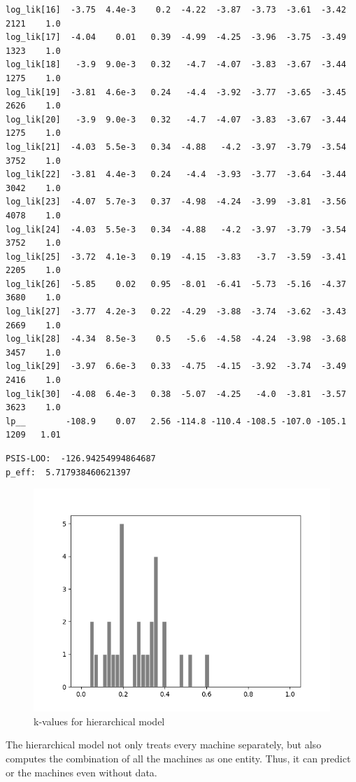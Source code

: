 \documentclass{article}
\begin{document}
\begin{verbatim}
log_lik[16]  -3.75  4.4e-3    0.2  -4.22  -3.87  -3.73  -3.61  -3.42   2121    1.0
log_lik[17]  -4.04    0.01   0.39  -4.99  -4.25  -3.96  -3.75  -3.49   1323    1.0
log_lik[18]   -3.9  9.0e-3   0.32   -4.7  -4.07  -3.83  -3.67  -3.44   1275    1.0
log_lik[19]  -3.81  4.6e-3   0.24   -4.4  -3.92  -3.77  -3.65  -3.45   2626    1.0
log_lik[20]   -3.9  9.0e-3   0.32   -4.7  -4.07  -3.83  -3.67  -3.44   1275    1.0
log_lik[21]  -4.03  5.5e-3   0.34  -4.88   -4.2  -3.97  -3.79  -3.54   3752    1.0
log_lik[22]  -3.81  4.4e-3   0.24   -4.4  -3.93  -3.77  -3.64  -3.44   3042    1.0
log_lik[23]  -4.07  5.7e-3   0.37  -4.98  -4.24  -3.99  -3.81  -3.56   4078    1.0
log_lik[24]  -4.03  5.5e-3   0.34  -4.88   -4.2  -3.97  -3.79  -3.54   3752    1.0
log_lik[25]  -3.72  4.1e-3   0.19  -4.15  -3.83   -3.7  -3.59  -3.41   2205    1.0
log_lik[26]  -5.85    0.02   0.95  -8.01  -6.41  -5.73  -5.16  -4.37   3680    1.0
log_lik[27]  -3.77  4.2e-3   0.22  -4.29  -3.88  -3.74  -3.62  -3.43   2669    1.0
log_lik[28]  -4.34  8.5e-3    0.5   -5.6  -4.58  -4.24  -3.98  -3.68   3457    1.0
log_lik[29]  -3.97  6.6e-3   0.33  -4.75  -4.15  -3.92  -3.74  -3.49   2416    1.0
log_lik[30]  -4.08  6.4e-3   0.38  -5.07  -4.25   -4.0  -3.81  -3.57   3623    1.0
lp__        -108.9    0.07   2.56 -114.8 -110.4 -108.5 -107.0 -105.1   1209   1.01
\end{verbatim}

\begin{verbatim}  
PSIS-LOO:  -126.94254994864687
p_eff:  5.717938460621397
\end{verbatim}

\begin{figure}[H]
\centering  
\includegraphics[scale=0.5]{hierarchical_hist.png}
\caption{k-values for hierarchical model}
\label{fig: label}
\end{figure}
The hierarchical model not only treats every machine separately, but also computes the combination of all the machines as one entity. Thus, it can predict or the machines even without data.
\end{document}
